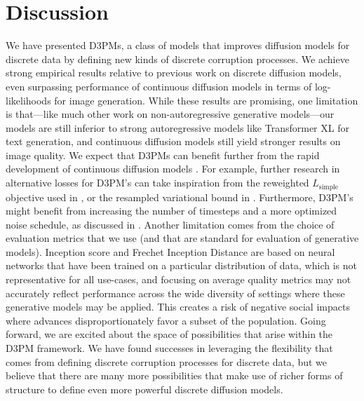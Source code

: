 \section{Discussion}
\label{sec:discussion}
We have presented D3PMs, a class of models that improves diffusion models for discrete data by defining new kinds of discrete corruption processes.
We achieve strong empirical results relative to previous work on discrete diffusion models, even surpassing performance of continuous diffusion models in terms of log-likelihoods for image generation.
While these results are promising, one limitation is that---like much other work on non-autoregressive generative models---our models are still inferior to strong autoregressive models like Transformer XL for text generation, and continuous diffusion models still yield stronger results on image quality.
We expect that D3PMs can benefit further from the rapid development of continuous diffusion models \citep{song2020_sde, nichol2021improved}. For example, further research in alternative losses for D3PM's can take inspiration from the reweighted $L_{\mathrm{simple}}$ objective used in \citep{ho2020denoising}, or the resampled variational bound in \citet{nichol2021improved}. Furthermore, D3PM's might benefit from increasing the number of timesteps and a more optimized noise schedule, as discussed in \citet{nichol2021improved}.
Another limitation comes from the choice of evaluation metrics that we use (and that are standard for evaluation of generative models). 
Inception score and Frechet Inception Distance are based on neural networks that have been trained on a particular distribution of data, which is not representative for all use-cases, and focusing on average quality metrics may not accurately reflect performance across the wide diversity of settings where these generative models may be applied.
This creates a risk of negative social impacts where advances disproportionately favor a subset of the population.
Going forward, we are excited about the space of possibilities that arise within the D3PM framework. 
We have found successes in leveraging the flexibility that comes from defining discrete corruption processes for discrete data, but we believe that there are many more possibilities that make use of richer forms of structure to define even more powerful discrete diffusion models.

